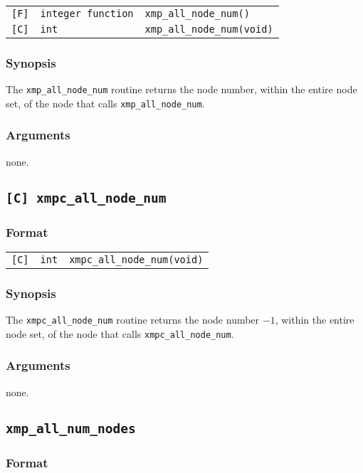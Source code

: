 \begin{tabular}{lll}
\verb![F]!&  {\tt integer function}& {\tt xmp\_all\_node\_num()}\\
\verb![C]!&  {\tt int}& {\tt xmp\_all\_node\_num(void)}
\end{tabular}

\subsubsection*{Synopsis}
The {\tt xmp\_all\_node\_num} routine returns the node number,
within the entire node set, of the node that calls {\tt xmp\_all\_node\_num}.

\subsubsection*{Arguments}
none.

\subsection{\tt [C] xmpc\_all\_node\_num}\label{sub:xmpcallnodenum}

\subsubsection*{Format}

\begin{tabular}{lll}
\verb![C]!&  {\tt int}& {\tt xmpc\_all\_node\_num(void)}
\end{tabular}

\subsubsection*{Synopsis}
The {\tt xmpc\_all\_node\_num} routine returns the node number $- 1$,
within the entire node set, of the node that calls {\tt xmpc\_all\_node\_num}.

\subsubsection*{Arguments}
none.

\subsection{\tt xmp\_all\_num\_nodes}

\subsubsection*{Format}


